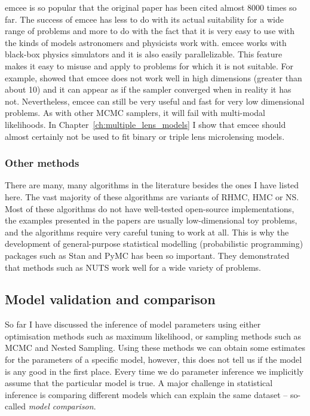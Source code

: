 \documentclass[12pt,dvipsnames]{report}
\newcommand{\ssf}[1]{\textsf{#1}}
\begin{document}
\ssf{emcee} is so popular that the 
original paper has been cited almost 8000 times so far.  
The success of \ssf{emcee} has less to do with its actual suitability 
for a wide range  of problems and more to do with the fact that it is very easy to use with the 
kinds of models astronomers and physicists work with. \ssf{emcee}  works with
black-box physics simulators and it is also easily parallelizable. 
This feature makes it easy to misuse and apply to problems for which it is 
not suitable. For example, \citet{arXiv:1509.02230} showed that \ssf{emcee} 
does not work well in high dimensions (greater than about 10) and it can appear 
as if the sampler converged when in reality it has not. Nevertheless, 
\ssf{emcee} can still be very useful and fast for very low dimensional 
problems. As with other MCMC samplers, it will fail with multi-modal 
likelihoods.
In Chapter~\ref{ch:multiple_lens_models} I show that \ssf{emcee} should almost certainly 
not be used to fit binary or triple lens microlensing models.


\subsubsection{Other methods}
There are many, many algorithms in the literature besides the ones I have listed here. 
The vast majority of these  algorithms are variants of RHMC, HMC or  
NS. Most of these algorithms do not have well-tested open-source implementations, 
the examples presented in the papers are usually low-dimensional toy 
problems, and the algorithms require very careful tuning to work at all. This 
is why the development of general-purpose statistical modelling 
(probabilistic programming) packages such as \ssf{Stan} and 
\ssf{PyMC} has been so important. They demonstrated that methods such as 
NUTS work well for a wide variety of problems.

\subsection{Model validation and comparison}
\label{ssec:model_comparison}

So far I have discussed the inference of model parameters using either optimisation 
methods such as maximum likelihood, or sampling methods such as MCMC and Nested 
Sampling.
Using these methods we can obtain some estimates for the parameters of a specific  
model, however, this does not tell us if the model is any good in the first place.
Every time we do parameter inference we implicitly assume that the particular model
is true.
A major challenge in statistical inference is comparing different 
models which can explain the same dataset -- so-called \emph{model comparison}.
\end{document}
